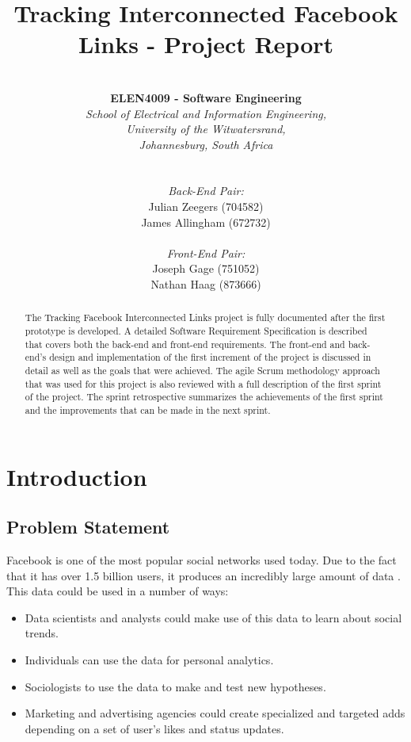 \documentclass[12pt,onecolumn]{article}
\title{\huge Tracking Interconnected Facebook Links - Project Report}
\author{ \horrule{1pt} \\ \textbf{ELEN4009 - Software Engineering} \\ \emph{School of Electrical and Information Engineering,} \\ \emph{University of the Witwatersrand,} \\ \emph{Johannesburg, South Africa} \\ \horrule{1pt} \\\\ \emph{Back-End Pair:} \\ Julian Zeegers (704582) \\ James Allingham (672732) \\ \\ \emph{Front-End Pair:} \\ Joseph Gage (751052)\\ Nathan Haag (873666) \\ \horrule{1pt}}
\begin{document}
	
	\date{\vspace{-5ex}}
	\maketitle
	\pagestyle{plain}
	\thispagestyle{empty}
	
	\begin{abstract}
		The Tracking Facebook Interconnected Links project is fully documented after the first prototype is developed. A detailed Software Requirement Specification is described that covers both the back-end and front-end requirements. The front-end and back-end's design and implementation of the first increment of the project is discussed in detail as well as the goals that were achieved. The agile Scrum methodology approach that was used for this project is also reviewed with a full description of the first sprint of the project. The sprint retrospective summarizes the achievements of the first sprint and the improvements that can be made in the next sprint. 
	\end{abstract}
	
	\newpage
	
	\tableofcontents
	\listoffigures
	\listoftables
	\thispagestyle{empty}
	\setcounter{page}{0}
	
	\newpage
	
	\section{Introduction}
	
	\subsection{Problem Statement} %
	
	Facebook is one of the most popular social networks used today. Due to the fact that it has over 1.5 billion users, it produces an incredibly large amount of data \cite{fb}. This data could be used in a number of ways:
	
	\begin{itemize}
		\item Data scientists and analysts could make use of this data to learn about social trends.
		
		\item Individuals can use the data for personal analytics.
		
		\item Sociologists to use the data to make and test new hypotheses.
		
		\item Marketing and advertising agencies could create specialized and targeted adds depending on a set of user's likes and status updates.
		
	\end{itemize}    
	
\end{document}
